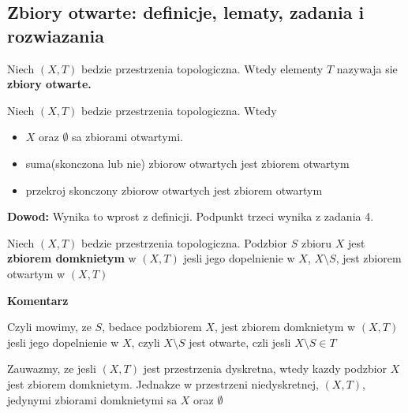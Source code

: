 \documentclass{article}
\begin{document}
\subsection{Zbiory otwarte: definicje, lematy, zadania i rozwiazania}
\begin{tcolorbox}[colback=white!90!red,colframe=black!35!red,title=1.2.1 Definicja: Zbior otwarty- open set]

    Niech $(X, T)$ bedzie przestrzenia topologiczna. Wtedy elementy $T$ nazywaja sie \textbf{zbiory otwarte.}

\end{tcolorbox}

\begin{tcolorbox}[colback=white!90!green,colframe=black!35!green,title=1.2.2 Lemat: Przestrzen topologiczna i zbiory otwarte]
    Niech $(X, T)$ bedzie przestrzenia topologiczna. Wtedy

    \begin{itemize}%

        \item $X$ oraz $\emptyset$ sa zbiorami otwartymi.
        \item suma(skonczona lub nie) zbiorow otwartych jest zbiorem otwartym
        \item przekroj skonczony zbiorow otwartych jest zbiorem otwartym
    \end{itemize}%
\end{tcolorbox}
\textbf{Dowod:}
Wynika to wprost z definicji. Podpunkt trzeci wynika z zadania 4.

\begin{tcolorbox}[colback=white!90!red,colframe=black!35!red,title=1.2.3 Definicja: Zbior domkniety- closed set]

    Niech $(X,T)$ bedzie przestrzenia topologiczna. Podzbior $S$ zbioru $X$ jest \textbf{zbiorem domknietym} w $(X, T)$ jesli jego dopelnienie w $X$, $X\setminus S$, jest zbiorem otwartym w $(X, T)$
\end{tcolorbox}
\textbf{Komentarz}

Czyli mowimy, ze $S$, bedace podzbiorem $X$, jest zbiorem domknietym w $(X,T)$ jesli jego dopelnienie w $X$, czyli $X\setminus S$ jest otwarte, czli jesli $X\setminus S \in T$

Zauwazmy, ze jesli $(X,T)$ jest przestrzenia dyskretna, wtedy kazdy podzbior $X$ jest zbiorem domknietym. Jednakze w przestrzeni niedyskretnej, $(X,T)$, jedynymi zbiorami domknietymi sa $X$ oraz $\emptyset$
\end{document}
